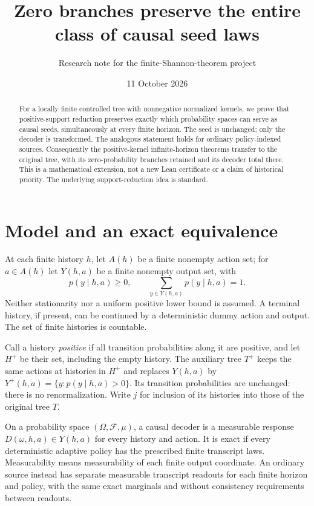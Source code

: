 \documentclass[11pt,a4paper]{article}
\title{Zero branches preserve the entire class of causal seed laws}
\author{Research note for the finite-Shannon-theorem project}
\date{11 October 2026}
\begin{document}
\maketitle
\begin{abstract}
For a locally finite controlled tree with nonnegative normalized kernels,
we prove that positive-support reduction preserves exactly which probability
spaces can serve as causal seeds, simultaneously at every finite horizon.
The seed is unchanged; only the decoder is transformed. The analogous
statement holds for ordinary policy-indexed sources. Consequently the
positive-kernel infinite-horizon theorems transfer to the original tree,
with its zero-probability branches retained and its decoder total there.
This is a mathematical extension, not a new Lean certificate or a claim
of historical priority. The underlying support-reduction idea is standard.
\end{abstract}

\section{Model and an exact equivalence}
At each finite history $h$, let $A(h)$ be a finite nonempty action set;
for $a\in A(h)$ let $Y(h,a)$ be a finite nonempty output set, with
\[
 p(y\mid h,a)\ge0,\qquad \sum_{y\in Y(h,a)}p(y\mid h,a)=1.
\]
Neither stationarity nor a uniform positive lower bound is assumed.
A terminal history, if present, can be continued by a deterministic dummy
action and output. The set of finite histories is countable.

Call a history \emph{positive} if all transition probabilities along it
are positive, and let $H^+$ be their set, including the empty history.
The auxiliary tree $T^+$ keeps the same actions at histories in $H^+$
and replaces $Y(h,a)$ by
$Y^+(h,a)=\{y:p(y\mid h,a)>0\}$. Its transition probabilities are
unchanged: there is no renormalization. Write $j$ for inclusion of its
histories into those of the original tree $T$.

On a probability space $(\Omega,\mathcal F,\mu)$, a causal decoder is a
measurable response $D(\omega,h,a)\in Y(h,a)$ for every history and action.
It is exact if every deterministic adaptive policy has the prescribed
finite transcript laws. Measurability means measurability of each finite
output coordinate. An ordinary source instead has separate measurable
transcript readouts for each finite horizon and policy, with the same
exact marginals and without consistency requirements between readouts.
\end{document}
